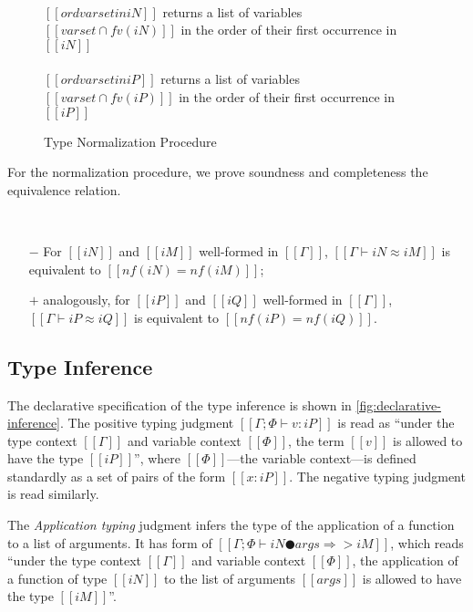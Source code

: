 \begin{figure}[h]
  \label{alg:type-nf}
  \hfill
  
  \begin{multicols}{2}
  \ottdefnNrmNNorm{}
  \\
  $[[ord varset in iN]]$ returns a list of variables
  $[[varset ∩ fv(iN)]]$ in the order of their first occurrence in $[[iN]]$
  \columnbreak\\
  \ottdefnNrmPNorm{}
  \\
  $[[ord varset in iP]]$ returns a list of variables
  $[[varset ∩ fv(iP)]]$ in the order of their first occurrence in $[[iP]]$
  \end{multicols}


  \caption{Type Normalization Procedure} 
  \label{fig:type-nf}
\end{figure}


For the normalization procedure, 
we prove soundness and completeness \wrt the equivalence relation.
\begin{property}
  \hfill \\
  \begin{itemize}
    \item[$-$] For $[[iN]]$ and $[[iM]]$ well-formed in $[[Γ]]$,
  $[[Γ ⊢ iN ≈ iM]]$ is equivalent to $[[nf(iN) = nf(iM)]]$;
    \item[$+$] analogously, for $[[iP]]$ and $[[iQ]]$ well-formed in $[[Γ]]$,
  $[[Γ ⊢ iP ≈ iQ]]$ is equivalent to $[[nf(iP) = nf(iQ)]]$.
  \end{itemize}
\end{property}


\subsection{Type Inference}

The declarative specification of the type inference is shown in 
\cref{fig:declarative-inference}.
The positive typing judgment $[[Γ ; Φ ⊢ v : iP]]$ is read as 
``under the type context $[[Γ]]$ and variable context $[[Φ]]$,
the term $[[v]]$ is allowed to have the type $[[iP]]$'',
where $[[Φ]]$---the variable context---is defined standardly as
a set of pairs of the form $[[x : iP]]$. 
The negative typing judgment is read similarly.

The \emph{Application typing} judgment
infers the type of the application of a function to a list of arguments.
It has form of $[[Γ ; Φ ⊢ iN ● args ⇒> iM]]$, 
which reads ``under the type context $[[Γ]]$ and variable context $[[Φ]]$,
the application of a function of type $[[iN]]$ to the list of arguments $[[args]]$
is allowed to have the type $[[iM]]$''.

